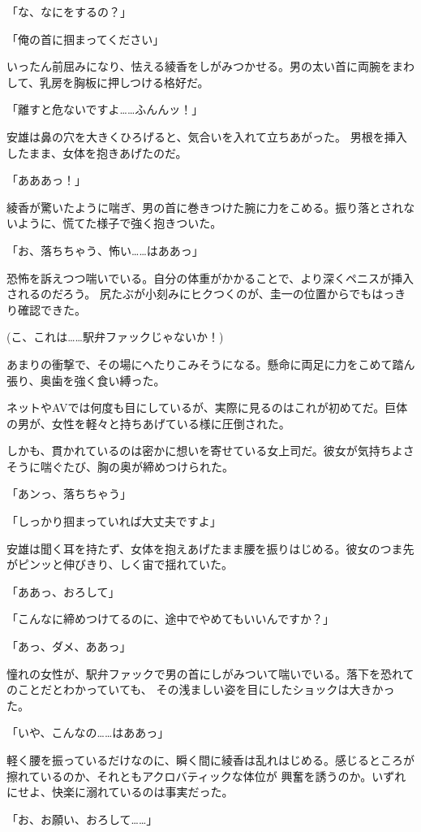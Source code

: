 ﻿\documentclass[
    book,tate,
    line_length=30zw,
    jafontsize=12pt,
    paper=b5j,
    landscape,
    ]{jlreq}
\begin{document}
「な、なにをするの？」

「俺の首に掴まってください」

いったん前屈みになり、怯える綾香をしがみつかせる。男の太い首に両腕をまわして、乳房を胸板に押しつける格好だ。

「離すと危ないですよ……ふんんッ！」

安雄は鼻の穴を大きくひろげると、気合いを入れて立ちあがった。 男根を挿入したまま、女体を抱きあげたのだ。

「あああっ！」

綾香が驚いたように喘ぎ、男の首に巻きつけた腕に力をこめる。振り落とされないように、慌てた様子で強く抱きついた。

「お、落ちちゃう、怖い……はああっ」

恐怖を訴えつつ喘いでいる。自分の体重がかかることで、より深くペニスが挿入されるのだろう。
尻たぶが小刻みにヒクつくのが、圭一の位置からでもはっきり確認できた。

(こ、これは……駅弁ファックじゃないか！)

あまりの衝撃で、その場にへたりこみそうになる。懸命に両足に力をこめて踏ん張り、奥歯を強く食い縛った。

ネットやAVでは何度も目にしているが、実際に見るのはこれが初めてだ。巨体の男が、女性を軽々と持ちあげている様に圧倒された。

しかも、貫かれているのは密かに想いを寄せている女上司だ。彼女が気持ちよさそうに喘ぐたび、胸の奥が締めつけられた。

「あンっ、落ちちゃう」

「しっかり掴まっていれば大丈夫ですよ」

安雄は聞く耳を持たず、女体を抱えあげたまま腰を振りはじめる。彼女のつま先がピンッと伸びきり、しく宙で揺れていた。

「ああっ、おろして」

「こんなに締めつけてるのに、途中でやめてもいいんですか？」

「あっ、ダメ、ああっ」

憧れの女性が、駅弁ファックで男の首にしがみついて喘いでいる。落下を恐れてのことだとわかっていても、
その浅ましい姿を目にしたショックは大きかった。

「いや、こんなの……はああっ」

軽く腰を振っているだけなのに、瞬く間に綾香は乱れはじめる。感じるところが擦れているのか、それともアクロバティックな体位が
興奮を誘うのか。いずれにせよ、快楽に溺れているのは事実だった。

「お、お願い、おろして……」
\end{document}
